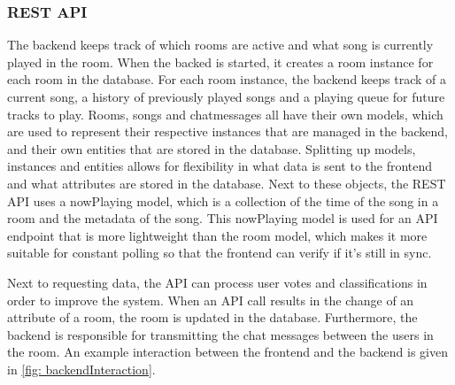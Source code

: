 \subsubsection{REST API}
The backend keeps track of which rooms are active and what song is currently played in the room.
When the backed is started, it creates a room instance for each room in the database.
For each room instance, the backend keeps track of a current song, a history of previously played songs 
and a playing queue for future tracks to play.
Rooms, songs and chatmessages all have their own models, which are used to represent their
respective instances that are managed in the backend, and their own entities that are stored in the database.
Splitting up models, instances and entities allows for flexibility in what data is sent to
the frontend and what attributes are stored in the database.
Next to these objects, the REST API uses a nowPlaying model, which is a collection of the time of the song in
a room and the metadata of the song. This nowPlaying model is used for an API endpoint that is more lightweight
than the room model, which makes it more suitable for constant polling so that the frontend can verify
if it's still in sync.

Next to requesting data, the API can process user votes and classifications in order to improve the system.
When an API call results in the change of an attribute of a room, the room is updated in the database.
Furthermore, the backend is responsible for transmitting the chat messages between the users in the room.
An example interaction between the frontend and the backend is given in \ref{fig: backendInteraction}.

